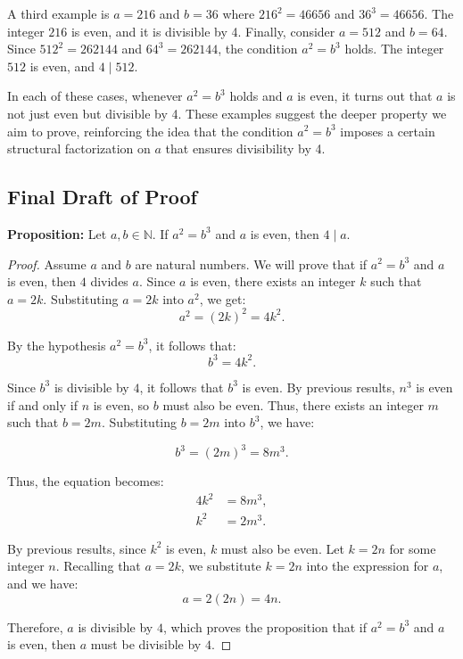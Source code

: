 \documentclass[12pt]{article}
\theoremstyle{definition}
\begin{document}
A third example is \(a = 216\) and \(b = 36\) where \(216^2 = 46656\) and \(36^3 = 46656\). The integer \(216\) is even, and it is divisible by 4. Finally, consider \(a = 512\) and \(b = 64\). Since \(512^2 = 262144\) and \(64^3 = 262144\), the condition \(a^2 = b^3\) holds. The integer \(512\) is even, and \(4 \mid 512\).

In each of these cases, whenever \(a^2 = b^3\) holds and \(a\) is even, it turns out that \(a\) is not just even but divisible by 4. These examples suggest the deeper property we aim to prove, reinforcing the idea that the condition \(a^2 = b^3\) imposes a certain structural factorization on \(a\) that ensures divisibility by 4.

\newpage

\subsection{Final Draft of Proof}

\textbf{Proposition:} Let \( a, b \in \mathbb{N} \). If \( a^2 = b^3 \) and \( a \) is even, then \( 4 \mid a \).

\begin{proof}
    Assume \( a \) and \( b \) are natural numbers. We will prove that if \( a^2 = b^3 \) and \( a \) is even, then \( 4 \) divides \( a \). Since \( a \) is even, there exists an integer \( k \) such that \( a = 2k \). Substituting \( a = 2k \) into \( a^2 \), we get:
    \[
    a^2 = (2k)^2 = 4k^2.
    \]

    By the hypothesis \( a^2 = b^3 \), it follows that:
    \[
    b^3 = 4k^2.
    \]

    Since \( b^3 \) is divisible by \( 4 \), it follows that \( b^3 \) is even. By previous results, \( n^3 \) is even if and only if \( n \) is even, so \( b \) must also be even. Thus, there exists an integer \( m \) such that \( b = 2m \). Substituting \( b = 2m \) into \( b^3 \), we have:

    \[
    b^3 = (2m)^3 = 8m^3.
    \]

    Thus, the equation becomes:
    \begin{align*}
        4k^2 & = 8m^3, \\
        k^2 & = 2m^3.
    \end{align*}

    By previous results, since \( k^2 \) is even, \( k \) must also be even. Let \( k = 2n \) for some integer \( n \). Recalling that \( a = 2k \), we substitute \( k = 2n \) into the expression for \( a \), and we have:  
    \[
    a = 2(2n) = 4n.
    \]

    Therefore, \( a \) is divisible by \( 4 \), which proves the proposition that if \( a^2 = b^3 \) and \( a \) is even, then \( a \) must be divisible by \( 4 \).
\end{proof}
\end{document}
